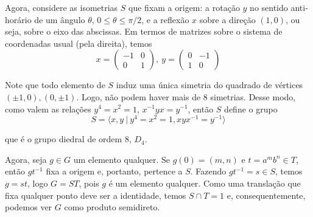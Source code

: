     	\par\vspace{0.3cm} Agora, considere as isometrias $S$ que fixam a origem: a rotação $y$ no 
    	sentido anti-horário de um ângulo $\theta$, $0\leq \theta\leq \pi/2$, e a reflexão $x$ sobre a 
    	direção $(1,0)$, ou seja, sobre o eixo das abscissas. Em termos de matrizes sobre o sistema de 
    	coordenadas usual (pela direita), temos
    	\begin{equation*}
        	x = \begin{pmatrix}
        	-1 & 0 \\
        	0 & 1
        	\end{pmatrix}, \ 
        	y = \begin{pmatrix}
        	0 & -1 \\
        	1 & 0 
        	\end{pmatrix}
    	\end{equation*} 
    	\par\vspace{0.3cm} Note que todo elemento de $S$ induz uma única simetria do quadrado de 
    	vértices $(\pm1, 0), (0,\pm1)$. Logo, não podem haver mais de $8$ simetrias. Desse modo, como 
    	valem as relações $y^4=x^2=1$, $x^{-1}yx = y^{-1}$, então $S$ define o grupo
    	\begin{equation*}
    	    S = \langle x,y \ | \ y^4=x^2=1, xyx^{-1}=y^{-1} \rangle
    	\end{equation*} 
    	\par\vspace{0.3cm} que é o grupo diedral de ordem $8$, $D_4$.
    	
    	\par\vspace{0.3cm} Agora, seja $g\in G$ um elemento qualquer. Se $g(0) = (m,n)$ e $t = a^mb^n\in T$, 
    	então $gt^{-1}$ fixa a origem e, portanto, pertence a $S$. Fazendo $gt^{-1} = s\in S$, temos $g = st$,
    	logo $G = ST$, pois $g$ é um elemento qualquer. Como uma translação que fixa qualquer ponto deve ser a
    	identidade, temos $S\cap T = 1$ e, consequentemente, podemos ver $G$ como produto semidireto.
    	
